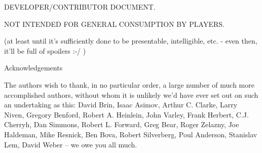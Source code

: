 \vspace{1cm}
\centerline{\LARGE DEVELOPER/CONTRIBUTOR DOCUMENT.}
\centerline{\LARGE NOT INTENDED FOR GENERAL CONSUMPTION BY PLAYERS.}
\vspace{0.5cm}
\centerline{(at least until it's sufficiently done to be presentable, intelligible, etc. - even then, it'll be full of spoilers :-/ )}
\vspace{3cm}
\clearpage
{\centerline{\LARGE Acknowledgements}}
\vspace{2cm}
{\rm 

The authors wish to thank, in no particular order, a large number of
much more accomplished authors, without whom it is unlikely we'd have
ever set out on such an undertaking as this: David Brin, Isaac Asimov,
Arthur C. Clarke, Larry Niven, Gregory Benford, Robert A. Heinlein,
John Varley, Frank Herbert, C.J. Cherryh, Dan Simmons, Robert
L. Forward, Greg Bear, Roger Zelazny, Joe Haldeman, Mike Resnick, Ben
Bova, Robert Silverberg, Poul Anderson, Stanislav Lem, David Weber --
we owe you all much.

}
